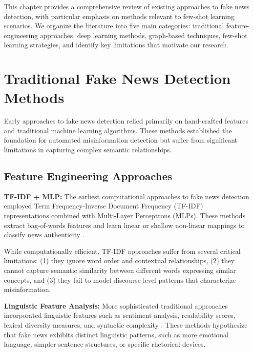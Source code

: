 
This chapter provides a comprehensive review of existing approaches to fake news detection, with particular emphasis on methods relevant to few-shot learning scenarios. We organize the literature into five main categories: traditional feature-engineering approaches, deep learning methods, graph-based techniques, few-shot learning strategies, and identify key limitations that motivate our research.

\section{Traditional Fake News Detection Methods}

Early approaches to fake news detection relied primarily on hand-crafted features and traditional machine learning algorithms. These methods established the foundation for automated misinformation detection but suffer from significant limitations in capturing complex semantic relationships.

\subsection{Feature Engineering Approaches}

\textbf{TF-IDF + MLP:} The earliest computational approaches to fake news detection employed Term Frequency-Inverse Document Frequency (TF-IDF) representations combined with Multi-Layer Perceptrons (MLPs). These methods extract bag-of-words features and learn linear or shallow non-linear mappings to classify news authenticity \cite{perez2017automatic, wang2017liar}.

While computationally efficient, TF-IDF approaches suffer from several critical limitations: (1) they ignore word order and contextual relationships, (2) they cannot capture semantic similarity between different words expressing similar concepts, and (3) they fail to model discourse-level patterns that characterize misinformation.

\textbf{Linguistic Feature Analysis:} More sophisticated traditional approaches incorporated linguistic features such as sentiment analysis, readability scores, lexical diversity measures, and syntactic complexity \cite{horne2017just, rashkin2017truth}. These methods hypothesize that fake news exhibits distinct linguistic patterns, such as more emotional language, simpler sentence structures, or specific rhetorical devices.


